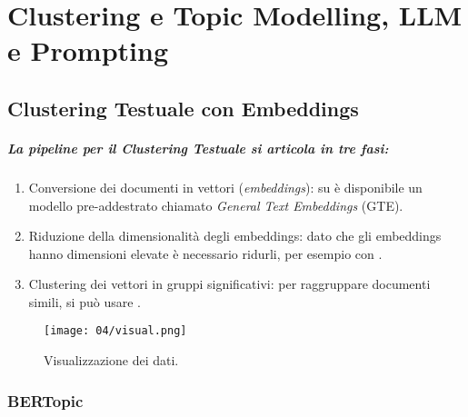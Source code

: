 \chapter{Clustering e Topic Modelling, LLM e Prompting}

\section{Clustering Testuale con Embeddings}

\paragraph{La pipeline per il Clustering Testuale si articola in tre fasi:}

\begin{enumerate}
  \item Conversione dei documenti in vettori (\textit{embeddings}): su  è disponibile un modello pre-addestrato chiamato \textit{General Text Embeddings} (GTE). 
  \item Riduzione della dimensionalità degli embeddings: dato che gli embeddings hanno dimensioni elevate è necessario ridurli, per esempio con . 
  \item Clustering dei vettori in gruppi significativi: per raggruppare documenti simili, si può usare .
\end{enumerate}


\begin{figure}[h]
    \centering
    \texttt{[image: 04/visual.png]}
    \caption{Visualizzazione dei dati.}
    \label{fig:vis}
\end{figure}

\subsection{BERTopic}


